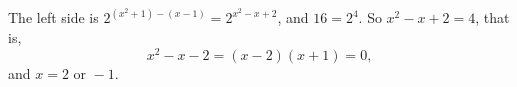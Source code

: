 The left side is $2^{(x^2+1)-(x-1)}=2^{x^2-x+2}$, and $16=2^4$. So $x^2-x+2=4$, that is,
\[
x^2-x-2=(x-2)(x+1)=0,
\]
and $x=\boxed{2\text{ or }-1}$.
